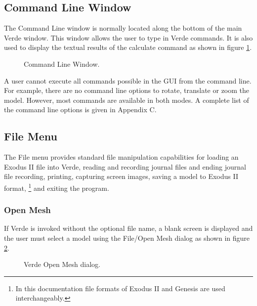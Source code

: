 \documentclass[10pt]{report}
\begin{document}
\subsection{Command Line Window}
\label{command_window}
The Command Line window is normally located along the bottom of the 
main Verde window.  This window allows the user to type in Verde 
commands.  It is also used to display the textual results of the 
calculate command as shown in figure \ref{fig:command_window}.

\htmlrule
\begin{figure}[tbh]
  \begin{center}
              {}
    \caption{Command Line Window.}
    \label{fig:command_window}
  \end{center}
\end{figure}     

A user cannot execute all commands possible in the GUI
from the command line.  For example, there are no command line
options to rotate, translate or zoom the model.  However, most
commands are available in both modes.
A complete list of the command line options is given in Appendix C.

\subsection{File Menu}

The File menu provides standard file manipulation capabilities for 
loading an Exodus II file into Verde, reading and recording journal 
files and ending journal file recording, printing, capturing screen 
images, saving a model to Exodus II format,
\footnote %
{
In this documentation file formats of Exodus II and Genesis are 
used interchangeably.
}
and exiting the program.


\subsubsection{Open Mesh}
\label{open_mesh}

If Verde is invoked without the optional file name, a blank screen is 
displayed and the user must select a model using the File/Open Mesh 
dialog as shown in figure \ref{fig:open_mesh}.

\htmlrule
\begin{figure}[tbh]
  \begin{center}
              {}
    \caption{Verde Open Mesh dialog.}
    \label{fig:open_mesh}
  \end{center}
\end{figure}     
\htmlrule
\end{document}
